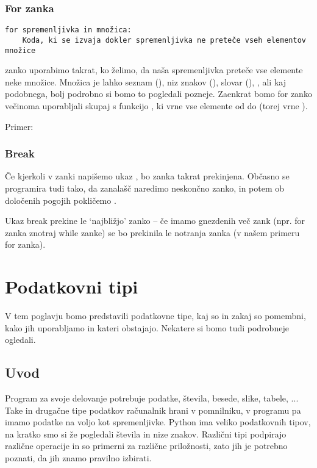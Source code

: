 \documentclass[letterpaper,10pt,english]{sphinxmanual}
\begin{document}
\subsection{For zanka}
\label{skripta/osnove:for-zanka}
\begin{Verbatim}[commandchars=\\\{\}]
for spremenljivka in množica:
    Koda, ki se izvaja dokler spremenljivka ne preteče vseh elementov množice
\end{Verbatim}

 zanko uporabimo takrat, ko želimo, da naša spremenljivka preteče vse
elemente neke množice. Množica je lahko seznam (), niz znakov
(), slovar (), ,  ali kaj podobnega,
bolj podrobno si bomo to pogledali pozneje. Zaenkrat bomo for zanko večinoma
uporabljali skupaj s funkcijo , ki vrne vse elemente od  do
 (torej  vrne \code{{[}0, 1, 2, 3, 4{]}}).

Primer:


\subsection{Break}
\label{skripta/osnove:break}
Če kjerkoli v zanki napišemo ukaz , bo zanka takrat prekinjena. Občasno se
programira tudi tako, da zanalašč naredimo neskončno zanko, in potem ob
določenih pogojih pokličemo .

Ukaz break prekine le `najbližjo' zanko -- če imamo gnezdenih več zank (npr. for
zanka znotraj while zanke) se bo prekinila le notranja zanka (v našem primeru
for zanka).


\chapter{Podatkovni tipi}
\label{skripta/podatkovni_tipi::doc}\label{skripta/podatkovni_tipi:podatkovni-tipi}
V tem poglavju bomo predstavili podatkovne tipe, kaj so in zakaj so pomembni, kako jih
uporabljamo in kateri obstajajo. Nekatere si bomo tudi podrobneje ogledali.


\section{Uvod}
\label{skripta/podatkovni_tipi:uvod}
Program za svoje delovanje potrebuje podatke, števila, besede, slike, tabele, ... Take in
drugačne tipe podatkov računalnik hrani v pomnilniku, v programu pa imamo podatke na
voljo kot spremenljivke. Python ima veliko podatkovnih tipov, na kratko smo si že
pogledali števila in nize znakov. Različni tipi podpirajo različne operacije in so
primerni za različne priložnosti, zato jih je potrebno poznati, da jih znamo pravilno
izbirati.
\end{document}
